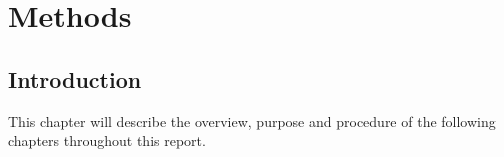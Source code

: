 \section{Methods}

\subsection{Introduction}
This chapter will describe the overview, purpose and procedure of the following chapters throughout this report.

%
%


